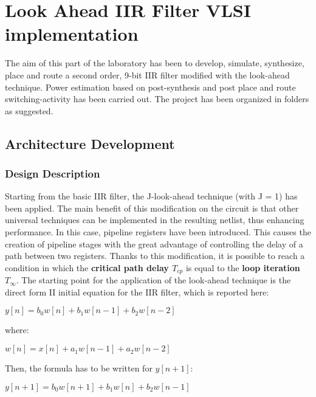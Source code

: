 \section{Look Ahead IIR Filter VLSI implementation}
The aim of this part of the laboratory has been to develop, simulate, synthesize, place and route a second order, 9-bit IIR filter modified with the look-ahead technique. Power estimation based on post-synthesis and post place and route switching-activity has been carried out. The project has been organized in folders as suggested.
\subsection{Architecture Development}
\subsubsection{Design Description}
Starting from the basic IIR filter, the J-look-ahead technique (with J = 1) has been applied. The main benefit of this modification on the circuit is that other universal techniques can be implemented in the resulting netlist, thus enhancing performance. In this case, pipeline registers have been introduced. This causes the creation of pipeline stages with the great advantage of controlling the delay of a path between two registers. Thanks to this modification, it is possible to reach a condition in which the \textbf{critical path delay $T_{cp}$} is equal to the \textbf{loop iteration $T_{\infty}$}.
\newline
\newline
The starting point for the application of the look-ahead technique is the direct form II initial equation for the IIR filter, which is reported here:

\begin{center}
$y[n] = b_{0}w[n] + b_{1}w[n-1] + b_{2}w[n-2]$
\end{center}

where:

\begin{center}
$w[n] = x[n] + a_{1}w[n-1] + a_{2}w[n-2]$
\end{center}

Then, the formula has to be written for $y[n+1]$:

\begin{center}
$y[n+1] = b_{0}w[n+1] + b_{1}w[n] + b_{2}w[n-1]$
\end{center}

